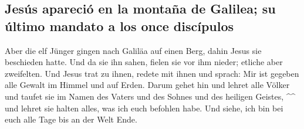 \hypertarget{jesuxfas-apareciuxf3-en-la-montauxf1a-de-galilea-su-uxfaltimo-mandato-a-los-once-discuxedpulos}{%
\subsection{Jesús apareció en la montaña de Galilea; su último mandato a
los once
discípulos}\label{jesuxfas-apareciuxf3-en-la-montauxf1a-de-galilea-su-uxfaltimo-mandato-a-los-once-discuxedpulos}}

 Aber die elf Jünger gingen nach Galiläa auf einen Berg,
dahin Jesus sie beschieden hatte.  Und da sie ihn sahen,
fielen sie vor ihm nieder; etliche aber zweifelten.  Und
Jesus trat zu ihnen, redete mit ihnen und sprach: Mir ist gegeben alle
Gewalt im Himmel und auf Erden.  Darum gehet hin und
lehret alle Völker und taufet sie im Namen des Vaters und des Sohnes und
des heiligen Geistes, \^{}\^{}  und lehret sie halten
alles, was ich euch befohlen habe. Und siehe, ich bin bei euch alle Tage
bis an der Welt Ende.
